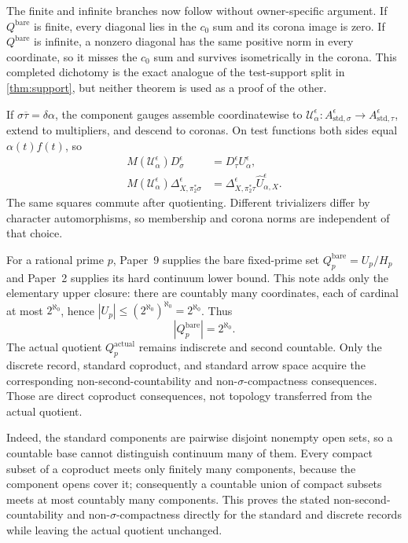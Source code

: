 \documentclass[11pt]{article}
\theoremstyle{definition}
\newcommand{\Qbare}{Q^{\mathrm{bare}}}
\begin{document}
The finite and infinite branches now follow without owner-specific
argument.  If $\Qbare$ is finite, every diagonal lies in the $c_0$ sum and
its corona image is zero.  If $\Qbare$ is infinite, a nonzero diagonal has
the same positive norm in every coordinate, so it misses the $c_0$ sum and
survives isometrically in the corona.  This completed dichotomy is the exact
analogue of the test-support split in \cref{thm:support}, but neither theorem
is used as a proof of the other.

If $\sigma\overline\tau=\delta\alpha$, the component gauges assemble
coordinatewise to
$\mathcal U_\alpha^{\epsilon}:A_{\mathrm{std},\sigma}^{\epsilon}
\to A_{\mathrm{std},\tau}^{\epsilon}$, extend to multipliers, and descend to
coronas.  On test functions both sides equal $\alpha(t)f(t)$, so
\begin{align*}
 M(\mathcal U_\alpha^{\epsilon})D_\sigma^{\epsilon}
   &=D_\tau^{\epsilon}U_\alpha^{\epsilon},\\
 M(\mathcal U_\alpha^{\epsilon})\Delta_{X,\pi_2^*\sigma}^{\epsilon}
   &=\Delta_{X,\pi_2^*\tau}^{\epsilon}
       \widehat U_{\alpha,X}^{\epsilon}.
\end{align*}
The same squares commute after quotienting.  Different trivializers differ
by character automorphisms, so membership and corona norms are independent
of that choice.

For a rational prime $p$, Paper~9 supplies the bare fixed-prime set
$Q_p^{\mathrm{bare}}=U_p/H_p$ and Paper~2 supplies its hard continuum lower
bound.  This note adds only the elementary upper closure: there are
countably many coordinates, each of cardinal at most $2^{\aleph_0}$, hence
$|U_p|\leq(2^{\aleph_0})^{\aleph_0}=2^{\aleph_0}$.  Thus
\[
 |Q_p^{\mathrm{bare}}|=2^{\aleph_0}.
\]
The actual quotient $Q_p^{\mathrm{actual}}$ remains indiscrete and second
countable.  Only the discrete record, standard coproduct, and standard arrow
space acquire the corresponding non-second-countability and
non-$\sigma$-compactness consequences.  Those are direct coproduct
consequences, not topology transferred from the actual quotient.

Indeed, the standard components are pairwise disjoint nonempty open sets,
so a countable base cannot distinguish continuum many of them.  Every
compact subset of a coproduct meets only finitely many components, because
the component opens cover it; consequently a countable union of compact
subsets meets at most countably many components.  This proves the stated
non-second-countability and non-$\sigma$-compactness directly for the
standard and discrete records while leaving the actual quotient unchanged.
\end{document}
